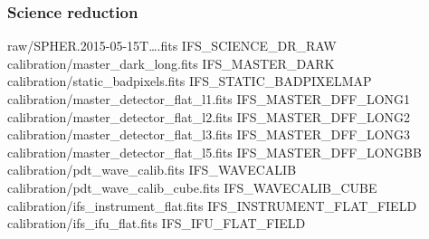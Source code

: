 \documentclass[twoside,single]{lion-msc}
\begin{document}
\subsubsection*{Science reduction}
\begin{mdframed}[linewidth = 0.3mm, linecolor = black]
raw/SPHER.2015-05-15T\dots.fits IFS\_SCIENCE\_DR\_RAW\\
calibration/master\_dark\_long.fits IFS\_MASTER\_DARK\\
calibration/static\_badpixels.fits IFS\_STATIC\_BADPIXELMAP\\
calibration/master\_detector\_flat\_l1.fits IFS\_MASTER\_DFF\_LONG1\\
calibration/master\_detector\_flat\_l2.fits IFS\_MASTER\_DFF\_LONG2\\
calibration/master\_detector\_flat\_l3.fits IFS\_MASTER\_DFF\_LONG3\\
calibration/master\_detector\_flat\_l5.fits IFS\_MASTER\_DFF\_LONGBB\\
calibration/pdt\_wave\_calib.fits IFS\_WAVECALIB\\
calibration/pdt\_wave\_calib\_cube.fits IFS\_WAVECALIB\_CUBE\\
calibration/ifs\_instrument\_flat.fits IFS\_INSTRUMENT\_FLAT\_FIELD\\
calibration/ifs\_ifu\_flat.fits IFS\_IFU\_FLAT\_FIELD
\end{mdframed}
\end{document}
